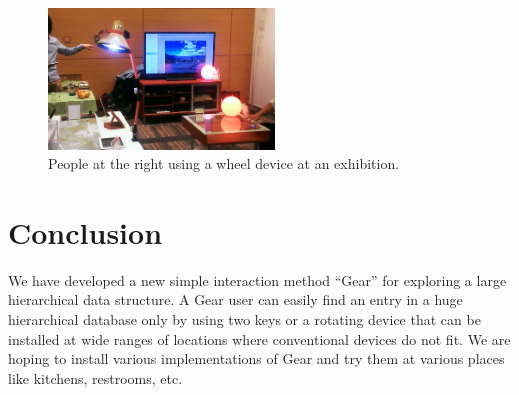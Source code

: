 \documentclass[conference]{IEEEtran}
\begin{document}
\begin{figure}[H]
\centerline{\includegraphics[width=60mm,bb=0 0 527 329]{figures/c520d5dfbd06c532d48d324a7019b00c.png}}
\caption{People at the right using a wheel device at an exhibition.}
\label{exhibition}
\end{figure}


\section{Conclusion}

We have developed a new simple interaction method ``Gear'' for exploring
a large hierarchical data structure.
A Gear user can easily find an entry in a huge hierarchical database
only by using two keys or a rotating device that can be installed at
wide ranges of locations where conventional devices do not fit.
We are hoping to install various implementations of Gear and try them at
various places like kitchens, restrooms, etc.

\small{


}
\end{document}
